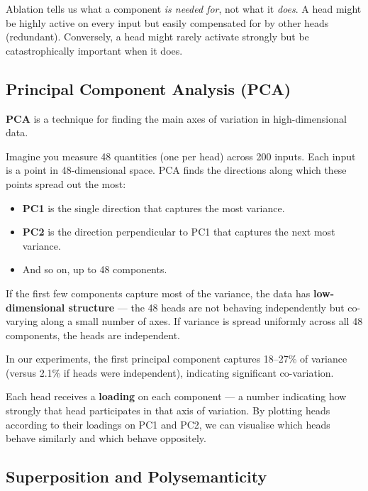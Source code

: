\documentclass[11pt,a4paper]{article}
\begin{document}
Ablation tells us what a component \emph{is needed for}, not what it \emph{does}.
A head might be highly active on every input but easily compensated for by other heads (redundant).
Conversely, a head might rarely activate strongly but be catastrophically important when it does.

\subsection{Principal Component Analysis (PCA)}
\label{sec:pca}

\textbf{PCA} is a technique for finding the main axes of variation in high-dimensional data.

Imagine you measure 48 quantities (one per head) across 200 inputs.
Each input is a point in 48-dimensional space.
PCA finds the directions along which these points spread out the most:

\begin{itemize}[itemsep=2pt]
    \item \textbf{PC1} is the single direction that captures the most variance.
    \item \textbf{PC2} is the direction perpendicular to PC1 that captures the next most variance.
    \item And so on, up to 48 components.
\end{itemize}

If the first few components capture most of the variance, the data has \textbf{low-dimensional structure} --- the 48 heads are not behaving independently but co-varying along a small number of axes.
If variance is spread uniformly across all 48 components, the heads are independent.

In our experiments, the first principal component captures 18--27\% of variance (versus 2.1\% if heads were independent), indicating significant co-variation.

Each head receives a \textbf{loading} on each component --- a number indicating how strongly that head participates in that axis of variation.
By plotting heads according to their loadings on PC1 and PC2, we can visualise which heads behave similarly and which behave oppositely.

\subsection{Superposition and Polysemanticity}
\label{sec:superposition}
\end{document}

